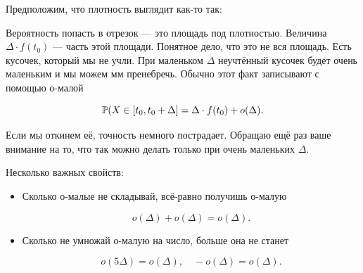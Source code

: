 \documentclass[12pt, a4paper, oneside]{article}
\begin{document}
Предположим, что плотность выглядит как-то так: 

\begin{center} 
\end{center} 

Вероятность попасть в отрезок --- это площадь под плотностью. Величина $\Delta \cdot f(t_0)$ --- часть этой площади. Понятное дело, что это не вся площадь. Есть кусочек, который мы не учли. При маленьком $\Delta$ неучтённый кусочек будет очень маленьким и мы можем мм пренебречь. Обычно этот факт записывают с помощью о-малой

\[
\mathbb{P}(X \in [t_0, t_0 + \Delta] = \Delta \cdot f(t_0) + o(\Delta).
\]

Если мы откинем её, точность немного пострадает. Обращаю ещё раз ваше внимание на то, что так можно делать только при очень маленьких $\Delta$. 

Несколько важных свойств: 

\begin{itemize} 
    \item Сколько о-малые не складывай, всё-равно получишь о-малую 
    
    \[o(\Delta) + o(\Delta) = o(\Delta).\]
    
    \item Сколько не умножай о-малую на число, больше она не станет
    
    \[o(5\Delta) = o(\Delta), \quad -o(\Delta) = o(\Delta). \]

\end{itemize} 
\end{document}
